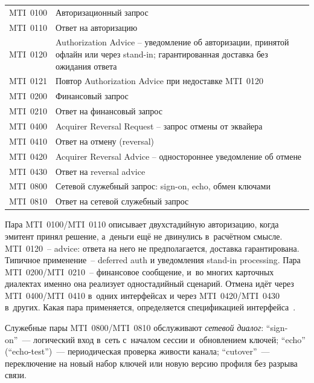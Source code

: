 \medskip
\noindent
\begingroup
\small
\setlength{\tabcolsep}{4pt}
\renewcommand{\arraystretch}{1.2}
\begin{tabularx}{\textwidth}{
    @{}P{0.12\textwidth}
    Y@{}
  }
  \toprule
  \headrow
   &  \\
  \midrule
  MTI~0100 & Авторизационный запрос \\
  MTI~0110 & Ответ на авторизацию \\
  MTI~0120 & Authorization Advice -- уведомление об авторизации,
  принятой офлайн или через stand-in; гарантированная доставка
  без ожидания ответа \\
  MTI~0121 & Повтор Authorization Advice при недоставке MTI~0120 \\
  MTI~0200 & Финансовый запрос \\
  MTI~0210 & Ответ на финансовый запрос \\
  MTI~0400 & Acquirer Reversal Request -- запрос отмены от эквайера \\
  MTI~0410 & Ответ на отмену (reversal) \\
  MTI~0420 & Acquirer Reversal Advice -- одностороннее уведомление об отмене \\
  MTI~0430 & Ответ на reversal advice \\
  MTI~0800 & Сетевой служебный запрос: sign-on, echo, обмен ключами \\
  MTI~0810 & Ответ на сетевой служебный запрос \\
  \bottomrule
\end{tabularx}%
\endgroup
\medskip
Пара MTI~0100/MTI~0110 описывает двухстадийную авторизацию, когда эмитент принял решение, а~деньги ещё не двинулись в~расчётном смысле.
MTI~0120~-- advice: ответа на него не предполагается, доставка гарантирована. Типичное применение~-- deferred auth и уведомления stand-in processing.
Пара MTI~0200/MTI~0210~-- финансовое сообщение, и~во многих карточных диалектах именно она реализует одностадийный сценарий.
Отмена идёт через MTI~0400/MTI~0410 в~одних интерфейсах и через MTI~0420/MTI~0430 в~других. Какая пара применяется, определяется спецификацией интерфейса~\cite{fis-iso8583-guide-2023}.

Служебные пары MTI~0800/MTI~0810 обслуживают \emph{сетевой диалог}: \enquote{sign-on}~--- логический вход в~сеть с~началом сессии и~обновлением ключей; \enquote{echo} (\enquote{echo-test})~--- периодическая проверка живости канала; \enquote{cutover}~--- переключение на новый набор ключей или новую версию профиля без разрыва связи.

